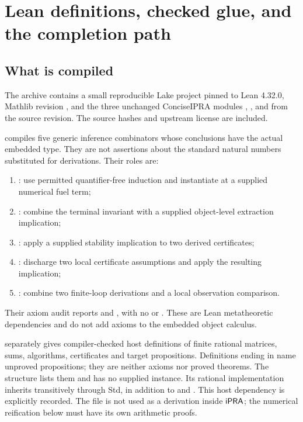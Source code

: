 \section{Lean definitions, checked glue, and the completion path}
\label{sec:lean}

\subsection{What is compiled}

The archive contains a small reproducible Lake project pinned to Lean 4.32.0, Mathlib revision
, and the three unchanged ConciseIPRA modules , , and  from the source revision. The source hashes and upstream license are included.

 compiles five generic inference combinators whose conclusions have the actual embedded  type. They are not assertions about the standard natural numbers substituted for derivations. Their roles are:
\begin{enumerate}
\item {}: use permitted quantifier-free induction and instantiate at a supplied numerical fuel term;
\item {}: combine the terminal invariant with a supplied object-level extraction implication;
\item {}: apply a supplied stability implication to two derived certificates;
\item {}: discharge two local certificate assumptions and apply the resulting implication;
\item {}: combine two finite-loop derivations and a local observation comparison.
\end{enumerate}

Their axiom audit reports  and , with no  or . These are Lean metatheoretic dependencies and do not add axioms to the embedded object calculus.

 separately gives compiler-checked host definitions of finite rational matrices, sums, algorithms, certificates and target propositions. Definitions ending in  name unproved propositions; they are neither axioms nor proved theorems. The structure  lists them and has no supplied instance. Its rational implementation inherits  transitively through Std, in addition to  and . This host dependency is explicitly recorded. The file is not used as a derivation inside $\mathsf{iPRA}$; the numerical reification below must have its own arithmetic proofs.

